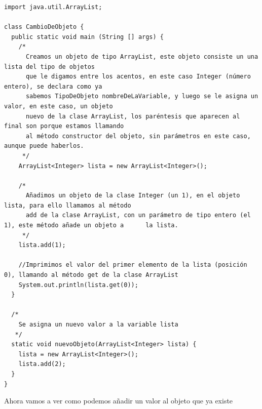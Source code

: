 \documentclass[11pt]{article}
\begin{document}
\begin{verbatim}
import java.util.ArrayList;

class CambioDeObjeto {
  public static void main (String [] args) {
    /*
      Creamos un objeto de tipo ArrayList, este objeto consiste un una lista del tipo de objetos
      que le digamos entre los acentos, en este caso Integer (número entero), se declara como ya
      sabemos TipoDeObjeto nombreDeLaVariable, y luego se le asigna un valor, en este caso, un objeto
      nuevo de la clase ArrayList, los paréntesis que aparecen al final son porque estamos llamando
      al método constructor del objeto, sin parámetros en este caso, aunque puede haberlos.
     */
    ArrayList<Integer> lista = new ArrayList<Integer>();

    /*
      Añadimos un objeto de la clase Integer (un 1), en el objeto lista, para ello llamamos al método
      add de la clase ArrayList, con un parámetro de tipo entero (el 1), este método añade un objeto a      la lista.
     */
    lista.add(1);

    //Imprimimos el valor del primer elemento de la lista (posición 0), llamando al método get de la clase ArrayList
    System.out.println(lista.get(0));
  }

  /*
    Se asigna un nuevo valor a la variable lista 
   */
  static void nuevoObjeto(ArrayList<Integer> lista) {
    lista = new ArrayList<Integer>();
    lista.add(2);
  }
}
\end{verbatim}

Ahora vamos a ver como podemos añadir un valor al objeto que ya existe
\end{document}
